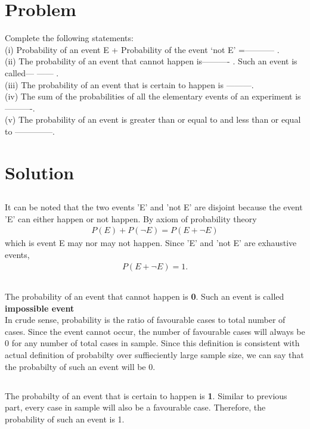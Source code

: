 \documentclass[journal,12pt,twocolumn]{IEEEtran}
\begin{document}
\section{Problem}
Complete the following statements:\\
(i) Probability of an event E + Probability of the event ‘not E’ =———– .\\
(ii) The probability of an event that cannot happen is———- . Such an event is called— —— . \\
(iii) The probability of an event that is certain to happen is ———. \\
(iv) The sum of the probabilities of all the elementary events of an experiment is———-.\\
(v) The probability of an event is greater than or equal to and less than or equal to ————–.

\section{Solution}
\subsection{}
 It can be noted that the two events 'E' and 'not E' are disjoint because the event 'E' can either happen or not happen.
By axiom of probability theory 
\begin{align}
	P(E)+P(\lnot E)=P(E+ \lnot E)
\end{align} 
which is event E may nor may not happen. Since 'E' and 'not E' are exhaustive events, 
\begin{align}
	P(E+ \lnot E)=1.
\end{align}
\subsection{}
The probability of an event that cannot happen is \textbf{0}. Such an event is called \textbf{impossible event}\\
In crude sense, probability is the ratio of favourable cases to total number of cases. Since the event cannot occur, the number of favourable cases will always be 0 for any number of total cases in sample. Since this definition is consistent with actual definition of probabilty over suffieciently large sample size, we can say that the probabilty of such an event will be 0.
\subsection{}
The probabilty of an event that is certain to happen is \textbf{1}.
Similar to previous part, every case in sample will also be a favourable case. Therefore, the probability of such an event is 1.
\end{document}
